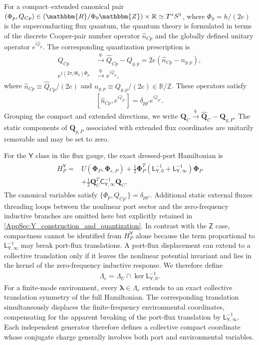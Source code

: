 \documentclass[prx,aps,twocolumn,article]{revtex4-2}
\newcommand{\msf}[1]{\mathsf{#1}}
\newcommand{\bsb}[1]{\boldsymbol{#1}}
\newcommand{\bPhi}{\bsb{\Phi}}
\newcommand{\bQ}{\bsb{Q}}
\newcommand{\msY}{\msf{Y}}
\newcommand{\msZ}{\msf{Z}}
\newcommand{\msL}{\msf{L}}
\newcommand{\msC}{\msf{C}}
\begin{document}
For a compact--extended canonical pair
$(\Phi_p,Q_{Cp})\in
(\mathbbm{R}/\Phi_0\mathbbm{Z})\times\mathbb{R}\simeq T^*S^1$,
where $\Phi_0=h/(2e)$ is the superconducting flux quantum, the quantum theory
is formulated in terms of the discrete Cooper-pair number operator
$\hat{n}_{Cp}$ and the globally defined unitary operator
$e^{i\hat{\varphi}_p}$. The corresponding quantization prescription is
\begin{align}
    Q_{Cp}
    &\overset{q.}{\rightarrow}
    \hat{Q}_{Cp}-Q_{g,p}
    =
    2e\left(\hat{n}_{Cp}-n_{g,p}\right),
    \\
    e^{i(2\pi/\Phi_0)\Phi_p}
    &\overset{q.}{\rightarrow}
    e^{i\hat{\varphi}_p},
\end{align}
where $\hat{n}_{Cp}\equiv\hat{Q}_{Cp}/(2e)$ and
$n_{g,p}\equiv Q_{g,p}/(2e)\in\mathbb{R}/\mathbb{Z}$. These operators satisfy
\begin{align}
    \left[
        \hat{n}_{Cp},
        e^{i\hat{\varphi}_{p'}}
    \right]
    =
    \delta_{pp'}e^{i\hat{\varphi}_{p'}}.
\end{align}
Grouping the compact and extended directions, we write
$\bQ_C\overset{q.}{\rightarrow}\hat{\bQ}_C-\bQ_{g,P}$.
The static components of $\bQ_{g,P}$ associated with extended flux coordinates
are unitarily removable and may be set to zero.

For the $\msY$ class in the flux gauge, the exact dressed-port Hamiltonian is
\begin{align}
\begin{aligned}
H_P^\msY
={}&
U(\bPhi_P,\bPhi_{e,P})
+
\frac{1}{2}
\bPhi_P^T
\left(
\msL_{\msY,0}^{-1}
+
\msL_{\msY,\infty}^{-1}
\right)
\bPhi_P\\
&+
\frac{1}{2}
\bQ_C^T
\msC_{\msY,\infty}^{-1}
\bQ_C.
\end{aligned}
\label{Eq:ExternalHamiltonianY}
\end{align}
The canonical variables satisfy
$\{\Phi_p,Q_{Cp'}\}=\delta_{pp'}$. Additional static external fluxes threading loops between the nonlinear port sector and the zero-frequency inductive branches are omitted here but explicitly retained in  \cref{AppSec:Y_construction_and_quantization}. In contrast with the $\msZ$ case, compactness cannot be identified from
$H_P^\msY$ alone because the term proportional to
$\msL_{\msY,\infty}^{-1}$ may break port-flux translations. A port-flux
displacement can extend to a collective translation only if it leaves the
nonlinear potential invariant and lies in the kernel of the zero-frequency
inductive response. We therefore define
\begin{align}
\Lambda_{\mathrm c}
=
\Lambda_U\cap\ker\msL_{\msY,0}^{-1}.
\label{Eq:YCompactTranslationLattice}
\end{align}
For a finite-mode environment, every
$\boldsymbol{\lambda}\in\Lambda_{\mathrm c}$ extends to an exact collective
translation symmetry of the full Hamiltonian. The corresponding translation
simultaneously displaces the finite-frequency environmental coordinates,
compensating for the apparent breaking of the port-flux translation by
$\msL_{\msY,\infty}^{-1}$. Each independent generator therefore defines a
collective compact coordinate whose conjugate charge generally involves both
port and environmental variables.
\end{document}
